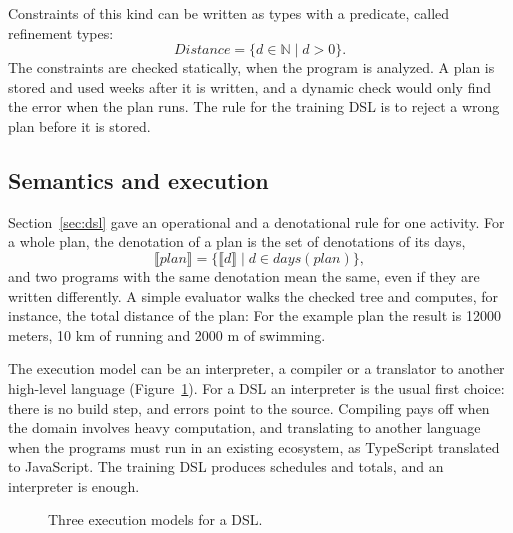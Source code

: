 Constraints of this kind can be written as types with a predicate, called
refinement types:
\[
  \mathit{Distance} = \{ d \in \mathbb{N} \mid d > 0 \}.
\]
The constraints are checked statically, when the program is analyzed. A plan
is stored and used weeks after it is written, and a dynamic check would only
find the error when the plan runs. The rule for the training DSL is to reject
a wrong plan before it is stored.

\subsection{Semantics and execution}

Section~\ref{sec:dsl} gave an operational and a denotational rule for one
activity. For a whole plan, the denotation of a plan is the set of
denotations of its days,
\[
  \llbracket \mathit{plan} \rrbracket = \{ \llbracket d \rrbracket \mid d \in \mathit{days}(\mathit{plan}) \},
\]
and two programs with the same denotation mean the same, even if they are
written differently. A simple evaluator walks the checked tree and computes,
for instance, the total distance of the plan:
For the example plan the result is 12000 meters, 10 km of running and 2000 m
of swimming.

The execution model can be an interpreter, a compiler or a translator to
another high-level language (Figure~\ref{fig:execution}). For a DSL an
interpreter is the usual first choice: there is no build step, and errors
point to the source. Compiling pays off when the domain involves heavy
computation, and translating to another language when the programs must run
in an existing ecosystem, as TypeScript translated to JavaScript. The training
DSL produces schedules and totals, and an interpreter is enough.

\begin{figure}[h]
\centering
{}
\caption{Three execution models for a DSL.}
\label{fig:execution}
\end{figure}


